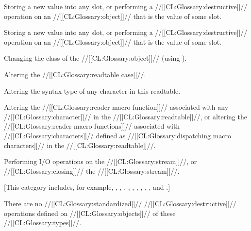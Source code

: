 Storing a new value into any slot, or performing a //[[CL:Glossary:destructive]]// operation on an //[[CL:Glossary:object]]//  that is the value of some slot.


Storing a new value into any slot, or performing a //[[CL:Glossary:destructive]]// operation on an //[[CL:Glossary:object]]//  that is the value of some slot.

Changing the class of the //[[CL:Glossary:object]]// (\eg using ).


Altering the //[[CL:Glossary:readtable case]]//.

Altering the syntax type of any character in this readtable.

Altering the //[[CL:Glossary:reader macro function]]// associated with any //[[CL:Glossary:character]]// in the //[[CL:Glossary:readtable]]//, or altering the //[[CL:Glossary:reader macro functions]]// associated with //[[CL:Glossary:characters]]// defined as //[[CL:Glossary:dispatching macro characters]]// in the //[[CL:Glossary:readtable]]//.


Performing I/O operations on the //[[CL:Glossary:stream]]//, or //[[CL:Glossary:closing]]// the //[[CL:Glossary:stream]]//.


 [This category includes, for example, ,
                                      ,
                                      ,
                                      ,
                                      ,
                                      ,
                                      ,
                                      ,
                                      ,
                                  and .]

There are no //[[CL:Glossary:standardized]]// //[[CL:Glossary:destructive]]// operations defined on //[[CL:Glossary:objects]]// of these //[[CL:Glossary:types]]//.

\endlist

\endsubsection%


